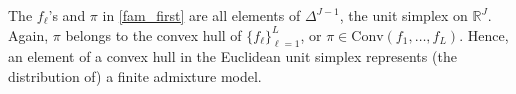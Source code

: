 \documentclass[12pt, reqno]{amsart}
\theoremstyle{definition}
\begin{document}



The $f_\ell$'s and $\pi$ in \eqref{fam_first} are all elements of $\Delta^{J-1}$, the unit simplex on $\mathbb{R}^J$. Again, $\pi$ belongs to the convex hull of  $\{f_\ell\}_{\ell=1}^L$, or $\pi \in \text{Conv}(f_1,\ldots,f_L)$. Hence, an element of a convex hull in the Euclidean unit simplex represents (the distribution of) a finite admixture model. 
\end{document}
